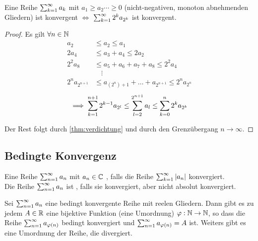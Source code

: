 \setcounter{thm}{15}
\begin{thm}[Verdichtung]
	\label{thm:verdichtung}
	Eine Reihe $\sum_{k=1}^{\infty} a_k$ mit $a_1 \geq a_2 \cdots \geq 0$ (nicht-negativen, monoton abnehmenden Gliedern) ist konvergent $\iff$ $\sum_{k=1}^{\infty} 2^k a_{2^k}$ ist konvergent.
\end{thm}
\begin{proof}
	Es gilt $\forall n\in \mathbb{N}$
	\begin{equation}
		\begin{aligned}
			a_2    &\leq a_2 \leq a_1 \\
			2a_4   &\leq a_3+a_4 \leq 2a_2 \\
			2^2a_8 &\leq a_5+a_6+a_7+a_8 \leq 2^2a_4 \\
			       &\quad \vdots \\
			2^{n} a_{2^{n+1}} & \leq a_{(2^n)+1} + \ldots + a_{2^{n+1}} \leq 2^n a_{2^n}
		\end{aligned}
	\end{equation}
	\begin{equation}
		\implies \sum_{k=1}^{n+1} 2^{k-1} a_{2^l} \leq \sum_{l=2}^{2^{n+1}} a_l \leq \sum_{k=0}^{n} 2^{k}a_{2^k}
	\end{equation}
	
	Der Rest folgt durch \autoref{thm:verdichtung} und durch den Grenzübergang $n \to \infty$.
\end{proof}


\subsection{Bedingte Konvergenz}
\begin{mydef}
	Eine Reihe $\sum_{n=1}^{\infty} a_n$ mit $a_n \in \mathbb{C}$ , falls die Reihe $\sum_{k=1}^{\infty} |a_n|$ konvergiert. \\
Die Reihe $\sum_{n=1}^{\infty} a_n$ ist , falls sie konvergiert, aber nicht absolut konvergiert.
\end{mydef}

\setcounter{thm}{20}
\begin{thm}
	Sei $\sum_{n=1}^{\infty} a_n$ eine bedingt konvergente Reihe mit reelen Gliedern. Dann gibt es zu jedem $A\in \mathbb{R}$ eine bijektive Funktion (eine Umordnung) $\varphi: \mathbb{N} \to \mathbb{N}$, so dass die Reihe $\sum_{n=1}^{\infty} a_{\varphi(n)}$ bedingt konvergiert und $\sum_{n=1}^{\infty} a_{\varphi(n)} = A$ ist. Weiters gibt es eine Umordnung der Reihe, die divergiert.	
\end{thm}


